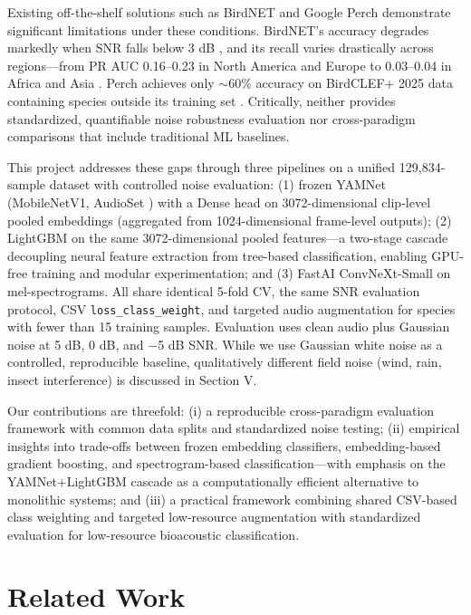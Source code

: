 \documentclass[conference]{IEEEtran}
\begin{document}
Existing off-the-shelf solutions such as BirdNET \cite{kahl2021birdnet} and Google Perch \cite{van2025perch} demonstrate significant limitations under these conditions. BirdNET's accuracy degrades markedly when SNR falls below 3 dB \cite{funosas2026global}, and its recall varies drastically across regions—from PR AUC 0.16--0.23 in North America and Europe to 0.03--0.04 in Africa and Asia \cite{funosas2026global}. Perch achieves only $\sim$60\% accuracy on BirdCLEF+ 2025 data containing species outside its training set \cite{van2025perch}. Critically, neither provides standardized, quantifiable noise robustness evaluation nor cross-paradigm comparisons that include traditional ML baselines.

This project addresses these gaps through three pipelines on a unified 129,834-sample dataset with controlled noise evaluation: (1) frozen YAMNet (MobileNetV1, AudioSet \cite{hershey2017cnn}) with a Dense head on 3072-dimensional clip-level pooled embeddings (aggregated from 1024-dimensional frame-level outputs); (2) LightGBM on the same 3072-dimensional pooled features---a two-stage cascade decoupling neural feature extraction from tree-based classification, enabling GPU-free training and modular experimentation; and (3) FastAI ConvNeXt-Small on mel-spectrograms. All share identical 5-fold CV, the same SNR evaluation protocol, CSV \texttt{loss\_class\_weight}, and targeted audio augmentation for species with fewer than 15 training samples. Evaluation uses clean audio plus Gaussian noise at 5 dB, 0 dB, and $-$5 dB SNR. While we use Gaussian white noise as a controlled, reproducible baseline, qualitatively different field noise (wind, rain, insect interference) is discussed in Section V.

Our contributions are threefold: (i) a reproducible cross-paradigm evaluation framework with common data splits and standardized noise testing; (ii) empirical insights into trade-offs between frozen embedding classifiers, embedding-based gradient boosting, and spectrogram-based classification---with emphasis on the YAMNet+LightGBM cascade as a computationally efficient alternative to monolithic systems; and (iii) a practical framework combining shared CSV-based class weighting and targeted low-resource augmentation with standardized evaluation for low-resource bioacoustic classification.


\section{Related Work}
\end{document}
